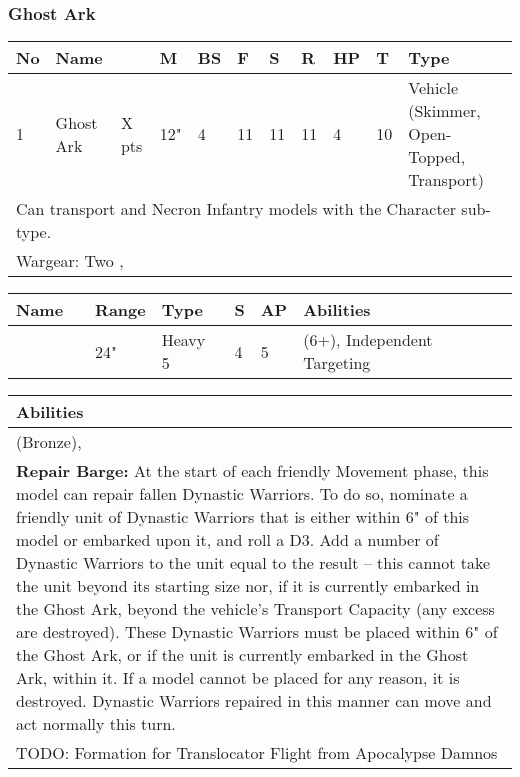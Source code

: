 \newpage
\subsubsection{Ghost Ark}

\noindent
\begin{tabular}{||m{10pt} m{95pt} m{30pt} m{11pt} m{11pt} m{11pt} m{11pt} m{11pt} m{11pt} m{11pt} m{200pt}||}
	\hline
	No & Name & & M & BS & F & S & R & HP & T & Type \\
	\hline
	1 & Ghost Ark & X pts & 12" & 4 & 11 & 11 & 11 & 4 & 10 & Vehicle (Skimmer, Open-Topped, Transport) \\
	\hline
	\hline
	\multicolumn{11}{||Z{532 pt}||}{Can transport \quickref{Dynastic Warriors} and Necron Infantry models with the Character sub-type.}\\		
	\hline
	\hline
	\multicolumn{11}{||Z{532 pt}||}{Wargear: Two \quickref{Gauss Flayer Arrays}, \quickref{Quantum Shielding}}\\
	\hline
\end{tabular}

\noindent
\begin{tabular}{||m{110pt} m{30pt} m{31pt} m{55pt} m{12pt} m{12pt} m{210pt}||}
	\hline
	Name & & Range & Type & S & AP & Abilities \\
	\hline
	\quickref{Gauss Flayer Arrays} & & 24" & Heavy 5 & 4 & 5 & \quickref{Gauss} (6+), Independent Targeting \\
	\hline
\end{tabular}


\noindent
\begin{tabular}{||m{532pt}||}
	\hline
	Abilities \\
	\hline
	\quickref{Awakening Protocols} (Bronze), \quickref{Living Metal}\\
	\textbf{Repair Barge:} At the start of each friendly Movement phase, this model can repair fallen Dynastic Warriors. To do so, nominate a friendly unit of Dynastic Warriors that is either within 6" of this model or embarked upon it, and roll a D3. Add a number of Dynastic Warriors to the unit equal to the result – this cannot take the unit beyond its starting size nor, if it is currently embarked in the Ghost Ark, beyond the vehicle’s Transport Capacity (any excess are destroyed). These Dynastic Warriors must be placed within 6" of the Ghost Ark, or if the unit is currently embarked in the Ghost Ark, within it. If a model cannot be placed for any reason, it is destroyed. Dynastic Warriors repaired in this manner can move and act normally this turn. \\
	TODO: Formation for Translocator Flight from Apocalypse Damnos \\
	\hline
\end{tabular}



